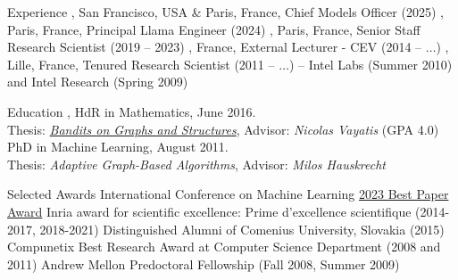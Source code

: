 \documentclass{resume}
\begin{document}
\begin{small}\maketitle\end{small}







\vspace{-2.3em}
\begin{category}{Experience}
\setlength\itemsep{0.2em}
, San Francisco, USA \& Paris, France, 
Chief Models Officer (2025) 
, Paris, France, 
Principal Llama Engineer (2024) 
, Paris, France,
Senior Staff Research Scientist (2019 -- 2023) 
, France, 
External Lecturer - CEV (2014 -- $\dots$)
, Lille, France,
Tenured Research Scientist (2011 -- $\dots$) 
 -- Intel Labs (Summer 2010) and Intel Research 
(Spring 2009)
\end{category}
\vspace{-0.5cm}
\begin{category}{Education}
\setlength\itemsep{0.15em}
, HdR in Mathematics, June 2016.\\
Thesis: \href{http://researchers.lille.inria.fr/~valko/hp/publications/valko2016bandits.pdf}{\emph{Bandits on Graphs and Structures}}, Advisor: \emph{Nicolas Vayatis}
 (GPA 4.0)
PhD in Machine Learning, August 2011. \\ Thesis: \emph{Adaptive Graph-Based Algorithms}, Advisor: \emph{Milos Hauskrecht}
\end{category}
\vspace{-0.5cm}
\begin{category}{Selected Awards}
\setlength\itemsep{0.1em}
\citemnobullet  International Conference on Machine Learning 
\href{https://arxiv.org/pdf/2212.12567}{2023 Best Paper Award}
	\citemnobullet Inria award for scientific excellence:
Prime d'excellence scientifique (2014-2017, 2018-2021)
\citemnobullet Distinguished Alumni of Comenius University, Slovakia (2015)
	\citemnobullet Compunetix Best Research Award at Computer Science 
Department (2008 
and 2011)	
       \citemnobullet Andrew Mellon Predoctoral Fellowship (Fall 2008, Summer 
2009)	
\end{category}
\end{document}
